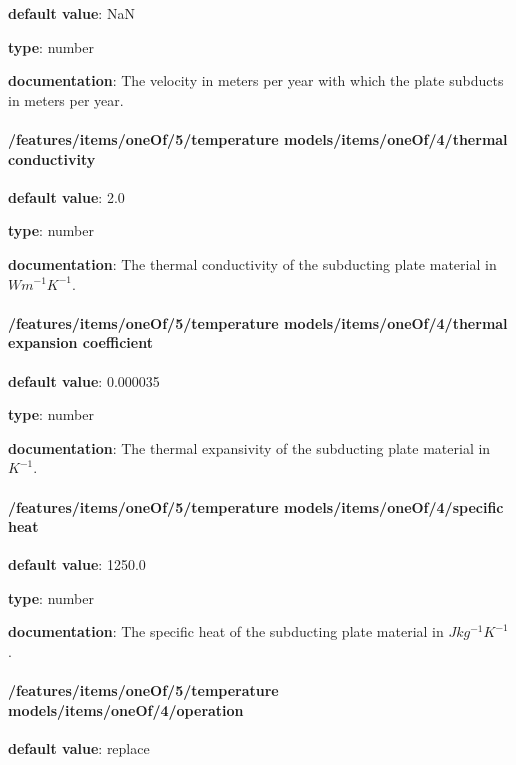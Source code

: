 \begin{itemized}
\item {\bf default value}: NaN
\item {\bf type}: number
\item {\bf documentation}: The velocity in meters per year with which the plate subducts in meters per year.
\end{itemized}\paragraph{/features/items/oneOf/5/temperature models/items/oneOf/4/thermal conductivity} \begin{itemized}
\item {\bf default value}: 2.0
\item {\bf type}: number
\item {\bf documentation}: The thermal conductivity of the subducting plate material in $W m^{-1} K^{-1}$.
\end{itemized}\paragraph{/features/items/oneOf/5/temperature models/items/oneOf/4/thermal expansion coefficient} \begin{itemized}
\item {\bf default value}: 0.000035
\item {\bf type}: number
\item {\bf documentation}: The thermal expansivity of the subducting plate material in $K^{-1}$.
\end{itemized}\paragraph{/features/items/oneOf/5/temperature models/items/oneOf/4/specific heat} \begin{itemized}
\item {\bf default value}: 1250.0
\item {\bf type}: number
\item {\bf documentation}: The specific heat of the subducting plate material in $J kg^{-1} K^{-1}$.
\end{itemized}\paragraph{/features/items/oneOf/5/temperature models/items/oneOf/4/operation} \begin{itemized}
\item {\bf default value}: replace

\end{itemized}
